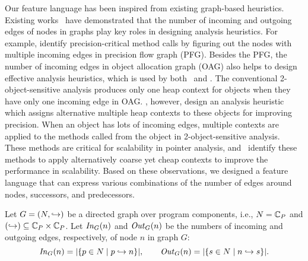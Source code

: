 Our feature language has been inspired from existing graph-based heuristics.
Existing works~\cite{Li2018a,Li2018b,TanLX16} have demonstrated that the number of incoming and outgoing edges of nodes in
graphs play key roles in designing analysis heuristics.
For example, \cite{Li2018a} identify precision-critical method calls
by figuring out the nodes with multiple incoming edges in precision flow graph (PFG).
Besides the PFG, the number of incoming edges in object allocation graph (OAG) also helps to design
effective analysis heuristics, which is used by both \cite{TanLX16}~and \cite{Li2018b}.
The conventional 2-object-sensitive analysis produces only one heap context for objects when they have only one incoming edge in OAG.
\cite{TanLX16}, however, design an analysis heuristic which assigns alternative multiple heap contexts to these objects for improving precision.
When an object has lots of incoming edges, multiple contexts are applied to the methods called from the object in 2-object-sensitive analysis.
These methods are critical for scalability in pointer analysis, and~\cite{Li2018b} identify these methods to apply alternatively coarse yet cheap contexts to improve the performance in scalability.
Based on these observations,
we designed a feature language that can express various combinations of the number of edges around nodes, successors, and predecessors.

Let $G=(N, \hookrightarrow)$ be a directed graph over program components, i.e., $N = \mathbb{C}_P$ and $(\hookrightarrow) \subseteq \mathbb{C}_P \times \mathbb{C}_P$.
Let ${\it In}_G(n)$ and ${\it Out}_G(n)$ be the numbers of incoming and outgoing edges, respectively, of node $n$ in graph $G$:
\[
{\it In}_{G}(n) = |\{  p \in N \mid p \hookrightarrow n  \}|, \qquad {\it Out}_{G}(n) = |\{ s \in N \mid n \hookrightarrow s \}|.
\]


